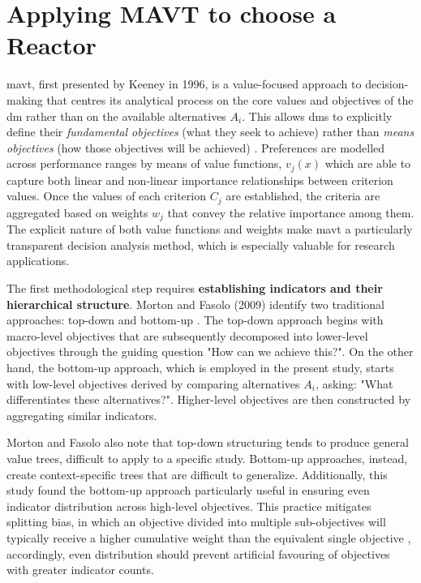 \section{Applying MAVT to choose a Reactor}
\label{sec:mavt_presentation}
\acrlong{mavt}, first presented by Keeney in 1996, is a value-focused approach to decision-making that centres its analytical process on the core values and objectives of the \gls{dm}  rather than on the available alternatives $A_i$. This allows \glspl{dm} to explicitly define their \textit{fundamental objectives} (what they seek to achieve) rather than \textit{means objectives} (how those objectives will be achieved) \cite{KEENEY1996537}. Preferences are modelled across performance ranges by means of value functions, $v_j(x)$ which are able to capture both linear and non-linear importance relationships between criterion values. Once the values of each criterion $C_j$ are established, the criteria are aggregated based on weights $w_j$ that convey the relative importance among them. The explicit nature of both value functions and weights make \gls{mavt} a particularly transparent decision analysis method, which is especially valuable for research applications.

The first methodological step requires \textbf{establishing indicators and their hierarchical structure}. Morton and Fasolo (2009) identify two traditional approaches: top-down and bottom-up \cite{Morton01022009}. The top-down approach begins with macro-level objectives that are subsequently decomposed into lower-level objectives through the guiding question "How can we achieve this?". On the other hand, the bottom-up approach, which is employed in the present study, starts with low-level objectives derived by comparing alternatives $A_i$, asking: "What differentiates these alternatives?". Higher-level objectives are then constructed by aggregating similar indicators.

Morton and Fasolo also note that top-down structuring tends to produce general value trees, difficult to apply to a specific study. Bottom-up approaches, instead, create context-specific trees that are difficult to generalize. Additionally, this study found the bottom-up approach particularly useful in ensuring even indicator distribution across high-level objectives. This practice mitigates splitting bias, in which an objective divided into multiple sub-objectives will typically receive a higher cumulative weight than the equivalent single objective \cite{MARTTUNEN2018178}, accordingly, even distribution should prevent artificial favouring of objectives with greater indicator counts.

